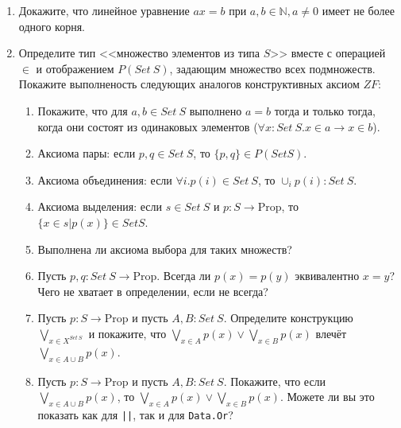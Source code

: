 \documentclass[10pt,a4paper,oneside]{article}
\begin{document}
\begin{enumerate}
\item Докажите, что линейное уравнение $ax = b$ при $a,b \in \mathbb{N}, a \ne 0$ имеет не более одного корня.

\item Определите тип <<множество элементов из типа $S$>> вместе с операцией $\in$ и отображением $P(Set\ S)$, задающим множество всех подмножеств. 
Покажите выполненость следующих аналогов конструктивных аксиом $ZF$:
\begin{enumerate}
\item Покажите, что для $a,b \in Set\ S$ выполнено $a = b$ тогда и только тогда, когда они состоят из одинаковых элементов ($\forall x:Set\ S.x \in a \rightarrow x \in b$).
\item Аксиома пары: если $p,q \in Set\ S$, то $\{p,q\} \in P(Set S)$.
\item Аксиома объединения: если $\forall i.p(i) \in Set\ S$, то $\cup_i p(i) : Set\ S$.
\item Аксиома выделения: если $s \in Set\ S$ и $p : S \rightarrow \text{Prop}$, то $\{ x\in s | p(x)\} \in Set S$.
\item Выполнена ли аксиома выбора для таких множеств?
\item Пусть $p,q: Set\ S \rightarrow \text{Prop}$. Всегда ли $p(x) = p(y)$ эквивалентно $x=y$? Чего не хватает в определении, если не всегда?
\item Пусть $p: S \rightarrow \text{Prop}$ и пусть $A,B : Set\ S$. Определите конструкцию $\bigvee_{x \in X^{Set\ S}}$ и 
покажите, что $\bigvee_{x \in A} p(x) \vee \bigvee_{x \in B} p(x)$ влечёт $\bigvee_{x\in A\cup B} p(x)$. 
\item Пусть $p: S \rightarrow \text{Prop}$ и пусть $A,B : Set\ S$. Покажите, что если $\bigvee_{x\in A\cup B} p(x)$, то $\bigvee_{x \in A} p(x) \vee \bigvee_{x \in B} p(x)$.
Можете ли вы это показать как для \verb!||!, так и для \verb!Data.Or!?
\end{enumerate}
\end{enumerate}
\end{document}
